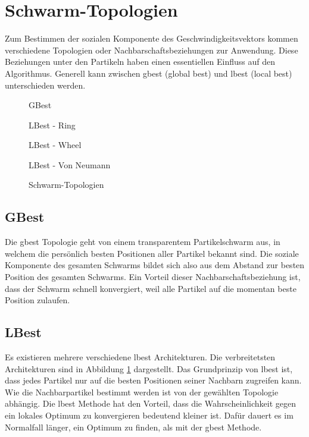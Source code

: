 \section{Schwarm-Topologien}
Zum Bestimmen der sozialen Komponente des Geschwindigkeitsvektors kommen verschiedene Topologien oder Nachbarschaftsbeziehungen zur Anwendung. Diese Beziehungen unter den Partikeln haben einen essentiellen Einfluss auf den Algorithmus. Generell kann zwischen gbest (global best) und lbest (local best) unterschieden werden.

\begin{figure}[htbp]
	\centering
	\begin{minipage}{4cm}
		\centering
		
		GBest
	\end{minipage}
	\begin{minipage}{4cm}
		\centering
		
		LBest - Ring
	\end{minipage}
	\begin{minipage}{4cm}
		\centering
		
		LBest - Wheel
	\end{minipage}
	\begin{minipage}{4cm}
		\centering
		
		LBest - Von Neumann
	\end{minipage}
	\caption{Schwarm-Topologien}
	\label{schwarm-topologien}
\end{figure}

\subsection{GBest}
Die gbest Topologie geht von einem transparentem Partikelschwarm aus, in welchem die persönlich besten Positionen aller Partikel bekannt sind. Die soziale Komponente des gesamten Schwarms bildet sich also aus dem Abstand zur besten Position des gesamten Schwarms. Ein Vorteil dieser Nachbarschaftsbeziehung ist, dass der Schwarm schnell konvergiert, weil alle Partikel auf die momentan beste Position zulaufen.

\subsection{LBest}
Es existieren mehrere verschiedene lbest Architekturen. Die verbreitetsten Architekturen sind in Abbildung \ref{schwarm-topologien} dargestellt. Das Grundprinzip von lbest ist, dass jedes Partikel nur auf die besten Positionen seiner Nachbarn zugreifen kann. Wie die Nachbarpartikel bestimmt werden ist von der gewählten Topologie abhängig. Die lbest Methode hat den Vorteil, dass die Wahrscheinlichkeit gegen ein lokales Optimum zu konvergieren bedeutend kleiner ist. Dafür dauert es im Normalfall länger, ein Optimum zu finden, als mit der gbest Methode.

